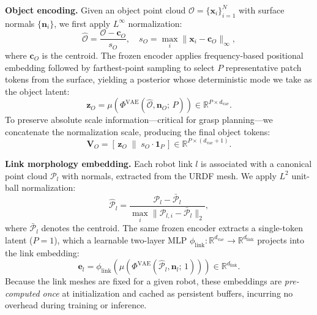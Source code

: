 \noindent\textbf{Object encoding.}
Given an object point cloud $\mathcal{O} = \{\mathbf{x}_i\}_{i=1}^N$ with surface normals $\{\mathbf{n}_i\}$, we first apply $L^\infty$ normalization:
\begin{equation}
    \hat{\mathcal{O}} = \frac{\mathcal{O} - \mathbf{c}_O}{s_O}, \quad s_O = \max_i \|\mathbf{x}_i - \mathbf{c}_O\|_\infty,
\end{equation}
where $\mathbf{c}_O$ is the centroid. The frozen encoder applies frequency-based positional embedding followed by farthest-point sampling to select $P$ representative patch tokens from the surface, yielding a posterior whose deterministic mode we take as the object latent:
\begin{equation}
    \mathbf{z}_O = \mu\!\left(\Phi^\text{VAE}(\hat{\mathcal{O}}, \mathbf{n}_O;\, P)\right) \in \mathbb{R}^{P \times d_\text{vae}}.
\end{equation}
To preserve absolute scale information---critical for grasp planning---we concatenate the normalization scale, producing the final object tokens:
\begin{equation}
    \mathbf{V}_O = \left[\,\mathbf{z}_O \;\|\; s_O \cdot \mathbf{1}_P\,\right] \in \mathbb{R}^{P \times (d_\text{vae}+1)}.
\end{equation}

\noindent\textbf{Link morphology embedding.}
Each robot link $l$ is associated with a canonical point cloud $\mathcal{P}_l$ with normals, extracted from the URDF mesh. We apply $L^2$ unit-ball normalization:
\begin{equation}
    \hat{\mathcal{P}}_l = \frac{\mathcal{P}_l - \bar{\mathcal{P}}_l}{\max_i \|\mathcal{P}_{l,i} - \bar{\mathcal{P}}_l\|_2},
\end{equation}
where $\bar{\mathcal{P}}_l$ denotes the centroid. The same frozen encoder extracts a single-token latent ($P{=}1$), which a learnable two-layer MLP $\phi_\text{link}: \mathbb{R}^{d_\text{vae}} \to \mathbb{R}^{d_\text{link}}$ projects into the link embedding:
\begin{equation}
    \mathbf{e}_l = \phi_\text{link}\!\left(\mu\!\left(\Phi^\text{VAE}(\hat{\mathcal{P}}_l, \mathbf{n}_l;\, 1)\right)\right) \in \mathbb{R}^{d_\text{link}}.
\end{equation}
Because the link meshes are fixed for a given robot, these embeddings are \emph{pre-computed once} at initialization and cached as persistent buffers, incurring no overhead during training or inference.

